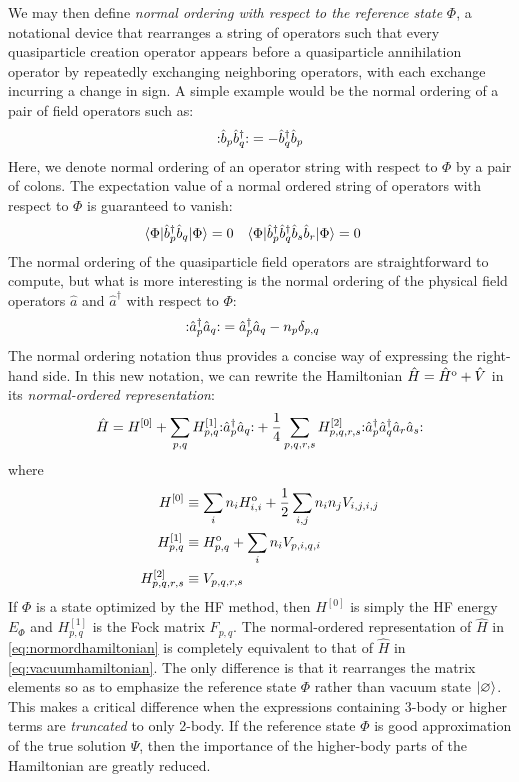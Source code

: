 We may then define \emph{normal ordering with respect to the reference state} $\Phi$, a notational device that rearranges a string of operators such that every quasiparticle creation operator appears before a quasiparticle annihilation operator by repeatedly exchanging neighboring operators, with each exchange incurring a change in sign.  A simple example would be the normal ordering of a pair of field operators such as:
\begin{align*}
  \mathopen: \hat{b}_p \hat{b}_q^\dagger \mathclose: =
  -\hat{b}_q^\dagger \hat{b}_p
\end{align*}
Here, we denote normal ordering of an operator string with respect to $\Phi$ by a pair of colons.  The expectation value of a normal ordered string of operators with respect to $\Phi$ is guaranteed to vanish:
\begin{align*}
&\langle \Phi | \hat{b}_p^\dagger \hat{b}_q | \Phi \rangle = 0 &
&\langle \Phi | \hat{b}_p^\dagger \hat{b}_q^\dagger \hat{b}_s \hat{b}_r | \Phi \rangle = 0
\end{align*}
The normal ordering of the quasiparticle field operators are straightforward to compute, but what is more interesting is the normal ordering of the physical field operators $\hat a$ and $\hat a^\dagger$ with respect to $\Phi$:
\begin{align*}
  \mathopen: \hat{a}_p^\dagger \hat{a}_q \mathclose: &=
  \hat{a}_p^\dagger \hat{a}_q - n_p \delta_{p, q}
\end{align*}
The normal ordering notation thus provides a concise way of expressing the right-hand side.  In this new notation, we can rewrite the Hamiltonian $\hat H = \hat H^{\text o} + \hat V$ in its \emph{normal-ordered representation}:
\begin{align}
  \hat{H} = H^{[0]} + \sum_{p, q} H^{[1]}_{p, q} \mathopen: \hat{a}_p^\dagger \hat{a}_q \mathclose: + \frac{1}{4} \sum_{p, q, r, s} H^{[2]}_{p, q, r, s} \mathopen: \hat{a}_p^\dagger \hat{a}_q^\dagger \hat{a}_r \hat{a}_s \mathclose:
  \label{eq:normordhamiltonian}
\end{align}
where
\begin{align*}
  H^{[0]} &\equiv \sum_{i} n_i H^{\text o}_{i, i} + \frac{1}{2} \sum_{i, j} n_i n_j V_{i, j, i, j} \\
  H^{[1]}_{p, q} &\equiv H^{\text o}_{p, q} + \sum_{i} n_i V_{p, i, q, i} \\
  H^{[2]}_{p, q, r, s} &\equiv V_{p, q, r, s} \\
\end{align*}
If $\Phi$ is a state optimized by the HF method, then $H^{[0]}$ is simply the HF energy $E_\Phi$ and $H^{[1]}_{p, q}$ is the Fock matrix $F_{p, q}$.  The normal-ordered representation of $\hat H$ in \eqref{eq:normordhamiltonian} is completely equivalent to that of $\hat H$ in \eqref{eq:vacuumhamiltonian}.  The only difference is that it rearranges the matrix elements so as to emphasize the reference state $\Phi$ rather than vacuum state $| \varnothing \rangle$.  This makes a critical difference when the expressions containing 3-body or higher terms are \emph{truncated} to only 2-body.  If the reference state $\Phi$ is good approximation of the true solution $\Psi$, then the importance of the higher-body parts of the Hamiltonian are greatly reduced.

